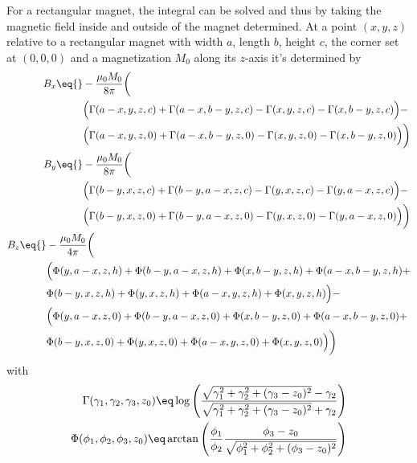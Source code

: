 \documentclass[\main/dresen_thesis.tex]{subfiles}
\begin{document}
For a rectangular magnet, the integral can be solved and thus by taking the magnetic field inside and outside of the magnet determined. At a point $(x,y,z)$ relative to a rectangular magnet with width $a$, length $b$, height $c$, the corner set at $(0,0,0)$ and a magnetization $M_0$ along its $z$-axis it's determined by
\begin{align}
  \begin{split}
    B_x \eq {}& -\frac{\mu_0 M_0}{8 \pi} \bigg( \\
              & \Big(\Gamma(a-x,y,z,c) +\Gamma(a-x,b-y,z,c) -\Gamma(x,y,z,c) -\Gamma(x,b-y,z,c)\Big) -\\
              & \Big(\Gamma(a-x,y,z,0) +\Gamma(a-x,b-y,z,0) -\Gamma(x,y,z,0) -\Gamma(x,b-y,z,0)\Big) \bigg)
  \end{split} \\
  \begin{split}
    B_y \eq {}& -\frac{\mu_0 M_0}{8 \pi} \bigg( \\
              & \Big(\Gamma(b-y,x,z,c) +\Gamma(b-y,a-x,z,c) -\Gamma(y,x,z,c) -\Gamma(y,a-x,z,c)\Big) -\\
              & \Big(\Gamma(b-y,x,z,0) +\Gamma(b-y,a-x,z,0) -\Gamma(y,x,z,0) -\Gamma(y,a-x,z,0)\Big) \bigg)
  \end{split} \\
  \begin{split}
    B_z \eq {}& -\frac{\mu_0 M_0}{4 \pi} \bigg( \\
              & \Big(\Phi(y,a-x,z,h) + \Phi(b-y,a-x,z,h) + \Phi(x,b-y,z,h) + \Phi(a-x,b-y,z,h) +\\
              &\Phi(b-y,x,z,h) + \Phi(y,x,z,h) + \Phi(a-x,y,z,h) + \Phi(x,y,z,h)\Big) -\\
              & \Big(\Phi(y,a-x,z,0) + \Phi(b-y,a-x,z,0) + \Phi(x,b-y,z,0) + \Phi(a-x,b-y,z,0) +\\
              &\Phi(b-y,x,z,0) + \Phi(y,x,z,0) + \Phi(a-x,y,z,0) + \Phi(x,y,z,0)\Big) \bigg)
  \end{split}
\end{align}
with
\begin{align}
\Gamma(\gamma_1, \gamma_2, \gamma_3, z_0) \eq \log \Bigg( \frac{\sqrt{\gamma_1^2 + \gamma_2^2 + (\gamma_3 - z_0)^2} - \gamma_2}{\sqrt{\gamma_1^2 + \gamma_2^2 + (\gamma_3 - z_0)^2} + \gamma_2} \Bigg) \\
\Phi(\phi_1, \phi_2, \phi_3, z_0) \eq \arctan \Bigg( \frac{\phi_1}{\phi_2} \frac{\phi_3 - z_0}{\sqrt{\phi_1^2 + \phi_2^2 + (\phi_3-z_0)^2}} \Bigg)
\end{align}
\end{document}
